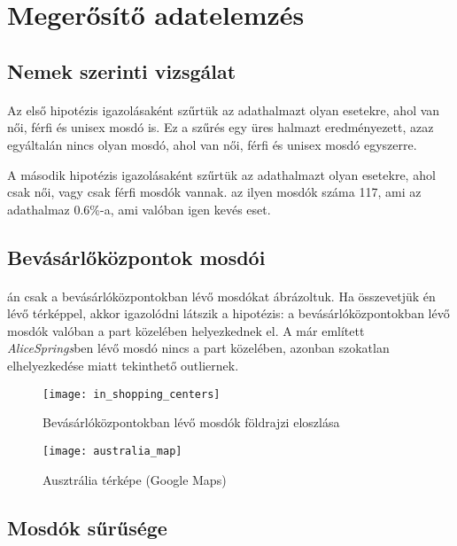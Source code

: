 	\section{Megerősítő adatelemzés}
	\subsection{Nemek szerinti vizsgálat}
	\paragraph{}
	\begin{compactlist}
		\item Az első hipotézis igazolásaként szűrtük az adathalmazt olyan esetekre, ahol van női, férfi és unisex mosdó is.	Ez a szűrés egy üres halmazt eredményezett, azaz egyáltalán nincs olyan mosdó, ahol van női, férfi és unisex mosdó egyszerre.
		\item A második hipotézis igazolásaként szűrtük az adathalmazt olyan esetekre, ahol csak női, vagy csak férfi mosdók vannak. az ilyen mosdók száma 117, ami az adathalmaz 0.6\%-a, ami valóban igen kevés eset.
	\end{compactlist}
	\subsection{Bevásárlőközpontok mosdói}
	\paragraph{}
		án csak a bevásárlóközpontokban lévő mosdókat ábrázoltuk. Ha összevetjük én lévő térképpel, akkor igazolódni látszik a hipotézis: a bevásárlóközpontokban lévő mosdók valóban a part közelében helyezkednek el. A már említett \textit{AliceSprings}ben lévő mosdó nincs a part közelében, azonban szokatlan elhelyezkedése miatt tekinthető outliernek.
		\begin{figure}[h]
			\centering	
			\texttt{[image: in\_shopping\_centers]}
			\caption{Bevásárlóközpontokban lévő mosdók földrajzi eloszlása}
			\label{fig:toilets_in_shopping_centers}
		\end{figure}		
		\begin{figure}[h]
			\centering	
			\texttt{[image: australia\_map]}
			\caption{Ausztrália térképe (Google Maps)}
			\label{fig:map}
		\end{figure}

	\subsection{Mosdók sűrűsége}
